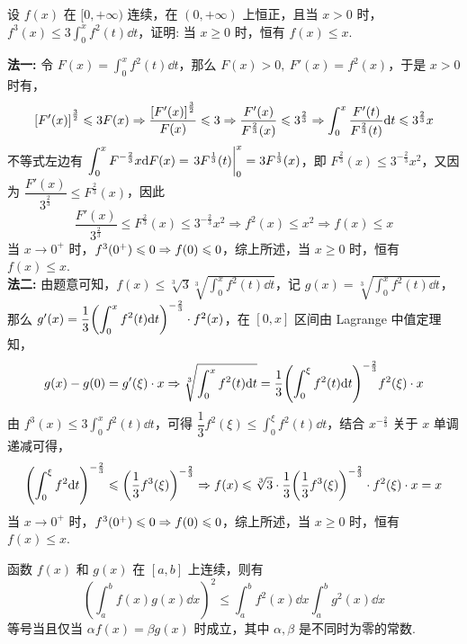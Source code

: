 \begin{example}
    设 $f(x)$ 在 $[0,+\infty)$ 连续，在 $(0,+\infty)$ 上恒正，且当 $x>0$ 时，$\displaystyle f^3(x)\leqslant 3\int_{0}^{x}f^2(t)\dd t$，证明: 当 $x\geqslant 0$ 时，恒有 $f(x)\leqslant x.$
\end{example}
\begin{solution}
    \textbf{法一: }令 $F(x)=\displaystyle\int_{0}^{x}f^2(t)\dd t$，那么 $F(x)>0,~F'(x)=f^2(x)$，于是 $x>0$ 时有，
    $$\qty[F'(x)]^{\frac{3}{2}}\leqslant 3F(x)\Rightarrow \dfrac{\qty[F'(x)]^{\frac{3}{2}}}{F(x)}\leqslant 3\Rightarrow \dfrac{F'(x)}{F^{\frac{2}{3}}(x)}\leqslant 3^{\frac{2}{3}}\Rightarrow \int_{0}^{x}\dfrac{F'(t)}{F^{\frac{2}{3}}(t)}\dd t\leqslant 3^{\frac{2}{3}}x$$
    不等式左边有 $\displaystyle\int_{0}^{x}F^{-\frac{2}{3}}x\dd F(x)=\eval{3F^{\frac{1}{3}}(t)}_{0}^{x}=3F^{\frac{1}{3}}(x)$，即 $F^{\frac{2}{3}}(x)\leqslant 3^{-\frac{2}{3}}x^2$，又因为 $\dfrac{F'(x)}{3^{\frac{2}{3}}}\leqslant F^{\frac{2}{3}}(x)$，因此
    $$\dfrac{F'(x)}{3^{\frac{2}{3}}}\leqslant F^{\frac{2}{3}}(x)\leqslant 3^{-\frac{2}{3}}x^2\Rightarrow f^2(x)\leqslant x^2\Rightarrow f(x)\leqslant x$$
    当 $x\to0^+$ 时，$f^3\qty(0^+)\leqslant 0\Rightarrow f(0)\leqslant 0$，综上所述，当 $x\geqslant 0$ 时，恒有 $f(x)\leqslant x.$\\
    \textbf{法二: }由题意可知，$f(x)\leqslant \sqrt[3]{3}\sqrt[3]{\displaystyle\int_{0}^{x}f^2(t)\dd t}$，记 $g(x)=\sqrt[3]{\displaystyle\int_{0}^{x}f^2(t)\dd t}$，那么 $g'(x)=\dfrac{1}{3}\qty(\displaystyle\int_{0}^{x}f^2(t)\dd t)^{-\frac{2}{3}}\cdot f^2(x)$，在 $[0,x]$ 区间由 Lagrange 中值定理知，
    $$g(x)-g(0)=g'(\xi)\cdot x\Rightarrow \sqrt[3]{\displaystyle\int_{0}^{x}f^2(t)\dd t}=\dfrac{1}{3}\qty(\displaystyle\int_{0}^{\xi}f^2(t)\dd t)^{-\frac{2}{3}}f^2(\xi)\cdot x$$
    由 $f^3(x)\leqslant 3\displaystyle\int_{0}^{x}f^2(t)\dd t$，可得 $\dfrac{1}{3}f^2(\xi)\leqslant \displaystyle \int_{0}^{\xi}f^2(t)\dd t$，结合 $x^{-\frac{2}{3}}$ 关于 $x$ 单调递减可得，
    $$\qty(\int_{0}^{\xi}f^2\dd t)^{-\frac{2}{3}}\leqslant \qty(\dfrac{1}{3}f^3(\xi))^{-\frac{2}{3}}\Rightarrow f(x)\leqslant \sqrt[3]{3}\cdot\dfrac{1}{3}\qty(\dfrac{1}{3}f^3(\xi))^{-\frac{2}{3}}\cdot f^2(\xi)\cdot x=x$$
    当 $x\to0^+$ 时，$f^3\qty(0^+)\leqslant 0\Rightarrow f(0)\leqslant 0$，综上所述，当 $x\geqslant 0$ 时，恒有 $f(x)\leqslant x.$
\end{solution}

\begin{theorem}
    函数 $f(x)$ 和 $g(x)$ 在 $[a,b]$ 上连续，则有
    $$\left(\int_{a}^{b}f(x)g(x)\dd x\right)^2\leqslant \int_{a}^{b}f^2(x)\dd x\int_{a}^{b}g^2(x)\dd x$$
    等号当且仅当 $\alpha f(x)=\beta g(x)$ 时成立，其中 $\alpha,\beta$ 是不同时为零的常数.
\end{theorem}

